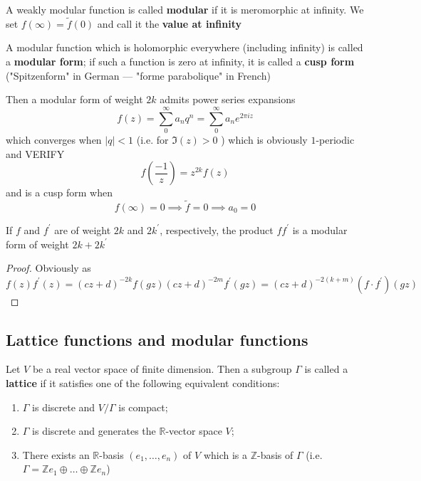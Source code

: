 \documentclass[12pt]{article}
\theoremstyle{definition}
\begin{document}
\begin{dfn}
A weakly modular function is called \textbf{modular} if it is meromorphic at infinity. We set \(f(\infty )= \widetilde{f}(0) \) and call it the \textbf{value at infinity}  
\end{dfn}
\begin{dfn}
A modular function which is holomorphic everywhere (including infinity) is called a \textbf{modular form}; if such a function is zero at infinity, it is called a \textbf{cusp form} ("Spitzenform" in German --- "forme parabolique" in French)  
\end{dfn}
Then a modular form of weight \(2k\) admits power series expansions
\[
    f(z) = \sum_{0}^{\infty} a_n q^n = \sum_{0}^{\infty} a_n e^{2\pi i z}
\]
which converges when \(\vert q \vert <1\) (i.e. for \(\Im (z)>0\) ) which is obviously \(1\)-periodic and VERIFY
\[
    f\left(\frac{-1}{z}\right) = z^{2k}f(z)
\]
and is a cusp form when \[f(\infty ) = 0 \implies \widetilde{f} = 0 \implies a_{0}=0 \]

\begin{claim}
    If \(f\) and \(f^{\prime} \) are of weight \(2k\) and \(2k^{\prime} \), respectively, the product \(f f^{\prime} \) is a modular form of weight \(2k+2k^{\prime} \)     
\end{claim}
\begin{proof}
    Obviously as
    \[
        f(z)f^{\prime}(z) = (cz+d)^{-2k} f(gz) (cz+d)^{-2m} f^{\prime} (gz) = (cz+d)^{-2(k+m)} (f\cdot f^{\prime} )(gz)
    \]
\end{proof}

\subsection{Lattice functions and modular functions}

\begin{dfn}
Let \(V\) be a real vector space of finite dimension. Then a subgroup \(\Gamma \) is called a \textbf{lattice} if it satisfies one of the following equivalent conditions:
\begin{enumerate}[label=(\alph*)]
    \item \(\Gamma \) is discrete and \(V/\Gamma \) is compact;
    \item \(\Gamma \) is discrete and generates the \(\mathbb{R} \)-vector space \(V\);
    \item There exists an \(\mathbb{R} \)-basis \((e_1,\dots,e_n)\) of \(V\) which is a \(\mathbb{Z} \)-basis of \(\Gamma \) (i.e. \(\Gamma = \mathbb{Z} e_1 \oplus  \dots \oplus \mathbb{Z} e_n\))        
\end{enumerate}   
\end{dfn}
\end{document}
